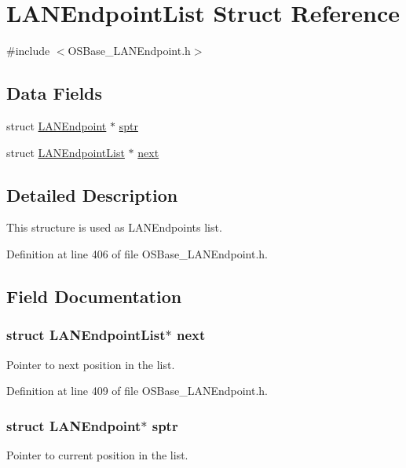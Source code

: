 \hypertarget{struct_l_a_n_endpoint_list}{
\section{LANEndpointList Struct Reference}
\label{struct_l_a_n_endpoint_list}
}


{\ttfamily \#include $<$OSBase\_\-LANEndpoint.h$>$}\subsection*{Data Fields}
\begin{DoxyCompactItemize}
\item 
struct \hyperlink{struct_l_a_n_endpoint}{LANEndpoint} $\ast$ \hyperlink{struct_l_a_n_endpoint_list_af99ab40e5865144db7deae544ce8ddaf}{sptr}
\item 
struct \hyperlink{struct_l_a_n_endpoint_list}{LANEndpointList} $\ast$ \hyperlink{struct_l_a_n_endpoint_list_a73dddd0fd4134de1e21beaba4329d0ac}{next}
\end{DoxyCompactItemize}


\subsection{Detailed Description}
This structure is used as LANEndpoints list. 

Definition at line 406 of file OSBase\_\-LANEndpoint.h.

\subsection{Field Documentation}
\hypertarget{struct_l_a_n_endpoint_list_a73dddd0fd4134de1e21beaba4329d0ac}{
\subsubsection[{next}]{\setlength{\rightskip}{0pt plus 5cm}struct {\bf LANEndpointList}$\ast$ {\bf next}}}
\label{struct_l_a_n_endpoint_list_a73dddd0fd4134de1e21beaba4329d0ac}
Pointer to next position in the list. 

Definition at line 409 of file OSBase\_\-LANEndpoint.h.\hypertarget{struct_l_a_n_endpoint_list_af99ab40e5865144db7deae544ce8ddaf}{
\subsubsection[{sptr}]{\setlength{\rightskip}{0pt plus 5cm}struct {\bf LANEndpoint}$\ast$ {\bf sptr}}}
\label{struct_l_a_n_endpoint_list_af99ab40e5865144db7deae544ce8ddaf}
Pointer to current position in the list. 

